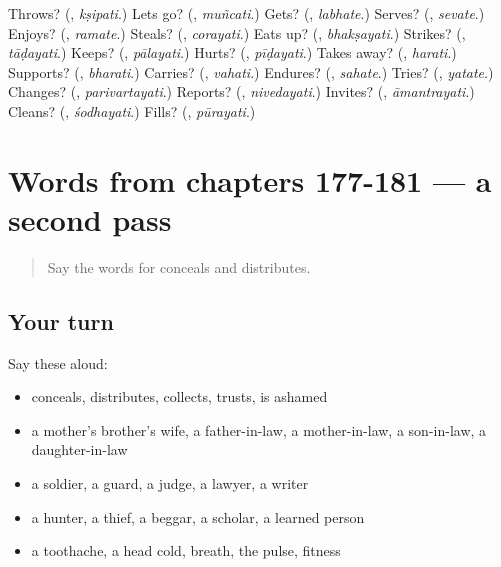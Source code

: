 \begin{tcolorbox}[breakable,colback=teal!4,colframe=teal!35!black,title={Before you move on}]
Throws? (\textbf{}, \emph{kṣipati}.) Lets go? (\textbf{}, \emph{muñcati}.) Gets? (\textbf{}, \emph{labhate}.) Serves? (\textbf{}, \emph{sevate}.) Enjoys? (\textbf{}, \emph{ramate}.) Steals? (\textbf{}, \emph{corayati}.) Eats up? (\textbf{}, \emph{bhakṣayati}.) Strikes? (\textbf{}, \emph{tāḍayati}.) Keeps? (\textbf{}, \emph{pālayati}.) Hurts? (\textbf{}, \emph{pīḍayati}.) Takes away? (\textbf{}, \emph{harati}.) Supports? (\textbf{}, \emph{bharati}.) Carries? (\textbf{}, \emph{vahati}.) Endures? (\textbf{}, \emph{sahate}.) Tries? (\textbf{}, \emph{yatate}.) Changes? (\textbf{}, \emph{parivartayati}.) Reports? (\textbf{}, \emph{nivedayati}.) Invites? (\textbf{}, \emph{āmantrayati}.) Cleans? (\textbf{}, \emph{śodhayati}.) Fills? (\textbf{}, \emph{pūrayati}.)
\end{tcolorbox}
\section[(dialogue)]{Words from chapters 177-181 — a second pass}

\label{lesson:SA-R181-second-pass-words-from-chapters-177-181}



\begin{quote}
Say the words for conceals and distributes.
\end{quote}

\subsection*{Your turn}
Say these aloud:

\begin{itemize}
\raggedright
  \item conceals, distributes, collects, trusts, is ashamed
  \item a mother's brother's wife, a father-in-law, a mother-in-law, a son-in-law, a daughter-in-law
  \item a soldier, a guard, a judge, a lawyer, a writer
  \item a hunter, a thief, a beggar, a scholar, a learned person
  \item a toothache, a head cold, breath, the pulse, fitness
\end{itemize}

